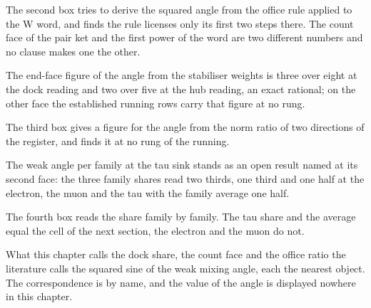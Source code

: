 The second box tries to derive the squared angle from the office rule applied to the W word, and finds the rule licenses only its first two steps there. The count face of the pair ket and the first power of the word are two different numbers and no clause makes one the other.
\begin{chwall}\label{box:VI-6-weak-angle:3}
The end-face figure of the angle from the stabiliser weights is three over eight at the dock reading and two over five at the hub reading, an exact rational; on the other face the established running rows carry that figure at no rung.
\end{chwall}
The third box gives a figure for the angle from the norm ratio of two directions of the register, and finds it at no rung of the running.
\begin{chwall}\label{box:VI-6-weak-angle:4}
The weak angle per family at the tau sink stands as an open result named at its second face: the three family shares read two thirds, one third and one half at the electron, the muon and the tau with the family average one half.
\end{chwall}
The fourth box reads the share family by family. The tau share and the average equal the cell of the next section, the electron and the muon do not.
\begin{chbridge}
What this chapter calls the dock share, the count face and the office ratio the literature calls the squared sine of the weak mixing angle, each the nearest object. The correspondence is by name, and the value of the angle is displayed nowhere in this chapter.
\end{chbridge}

